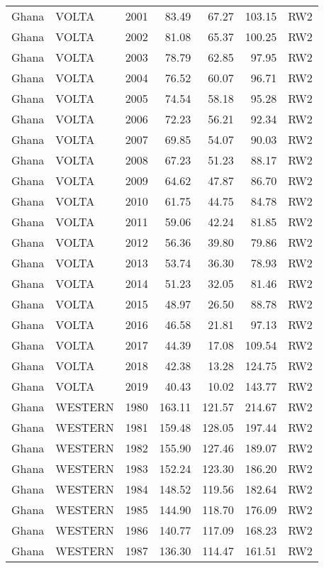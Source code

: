\begin{longtable}{lllrrrl}
  Ghana & VOLTA & 2001 & 83.49 & 67.27 & 103.15 & RW2 \\ 
  Ghana & VOLTA & 2002 & 81.08 & 65.37 & 100.25 & RW2 \\ 
  Ghana & VOLTA & 2003 & 78.79 & 62.85 & 97.95 & RW2 \\ 
  Ghana & VOLTA & 2004 & 76.52 & 60.07 & 96.71 & RW2 \\ 
  Ghana & VOLTA & 2005 & 74.54 & 58.18 & 95.28 & RW2 \\ 
  Ghana & VOLTA & 2006 & 72.23 & 56.21 & 92.34 & RW2 \\ 
  Ghana & VOLTA & 2007 & 69.85 & 54.07 & 90.03 & RW2 \\ 
  Ghana & VOLTA & 2008 & 67.23 & 51.23 & 88.17 & RW2 \\ 
  Ghana & VOLTA & 2009 & 64.62 & 47.87 & 86.70 & RW2 \\ 
  Ghana & VOLTA & 2010 & 61.75 & 44.75 & 84.78 & RW2 \\ 
  Ghana & VOLTA & 2011 & 59.06 & 42.24 & 81.85 & RW2 \\ 
  Ghana & VOLTA & 2012 & 56.36 & 39.80 & 79.86 & RW2 \\ 
  Ghana & VOLTA & 2013 & 53.74 & 36.30 & 78.93 & RW2 \\ 
  Ghana & VOLTA & 2014 & 51.23 & 32.05 & 81.46 & RW2 \\ 
  Ghana & VOLTA & 2015 & 48.97 & 26.50 & 88.78 & RW2 \\ 
  Ghana & VOLTA & 2016 & 46.58 & 21.81 & 97.13 & RW2 \\ 
  Ghana & VOLTA & 2017 & 44.39 & 17.08 & 109.54 & RW2 \\ 
  Ghana & VOLTA & 2018 & 42.38 & 13.28 & 124.75 & RW2 \\ 
  Ghana & VOLTA & 2019 & 40.43 & 10.02 & 143.77 & RW2 \\ 
  Ghana & WESTERN & 1980 & 163.11 & 121.57 & 214.67 & RW2 \\ 
  Ghana & WESTERN & 1981 & 159.48 & 128.05 & 197.44 & RW2 \\ 
  Ghana & WESTERN & 1982 & 155.90 & 127.46 & 189.07 & RW2 \\ 
  Ghana & WESTERN & 1983 & 152.24 & 123.30 & 186.20 & RW2 \\ 
  Ghana & WESTERN & 1984 & 148.52 & 119.56 & 182.64 & RW2 \\ 
  Ghana & WESTERN & 1985 & 144.90 & 118.70 & 176.09 & RW2 \\ 
  Ghana & WESTERN & 1986 & 140.77 & 117.09 & 168.23 & RW2 \\ 
  Ghana & WESTERN & 1987 & 136.30 & 114.47 & 161.51 & RW2 \\ 

\end{longtable}

